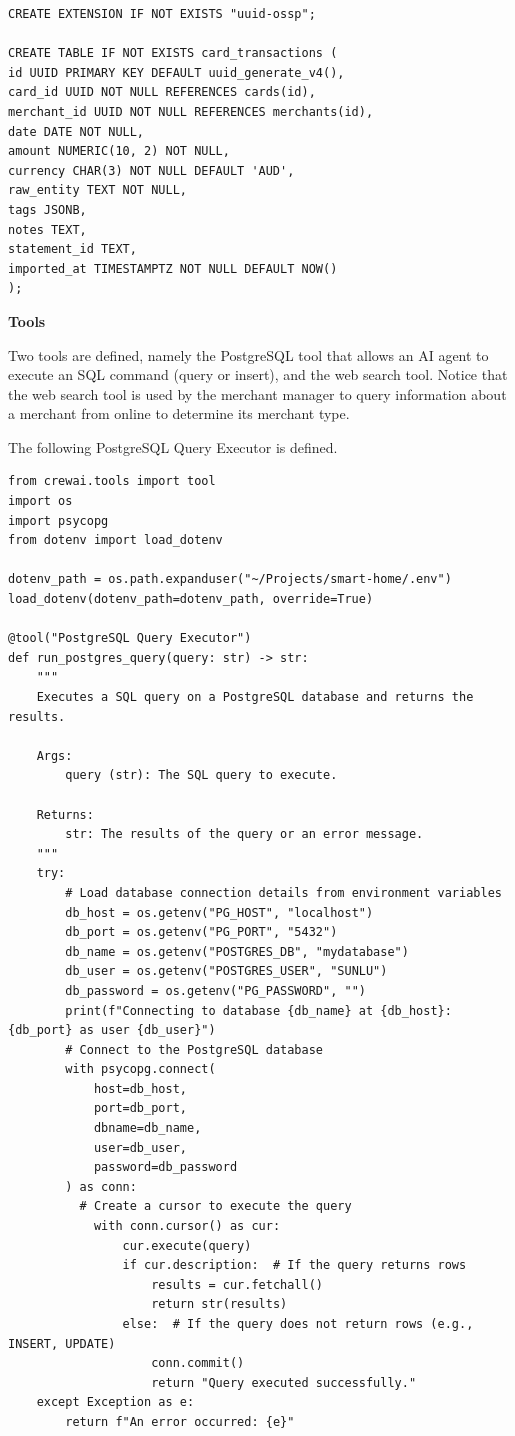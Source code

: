 \begin{lstlisting}
CREATE EXTENSION IF NOT EXISTS "uuid-ossp";

CREATE TABLE IF NOT EXISTS card_transactions (
id UUID PRIMARY KEY DEFAULT uuid_generate_v4(),
card_id UUID NOT NULL REFERENCES cards(id),
merchant_id UUID NOT NULL REFERENCES merchants(id),
date DATE NOT NULL,
amount NUMERIC(10, 2) NOT NULL,
currency CHAR(3) NOT NULL DEFAULT 'AUD',
raw_entity TEXT NOT NULL,
tags JSONB,
notes TEXT,
statement_id TEXT,
imported_at TIMESTAMPTZ NOT NULL DEFAULT NOW()
);
\end{lstlisting}

\vspace{0.1in}
\noindent \textbf{Tools}
\vspace{0.1in}

Two tools are defined, namely the PostgreSQL tool that allows an AI agent to execute an SQL command (query or insert), and the web search tool. Notice that the web search tool is used by the merchant manager to query information about a merchant from online to determine its merchant type.

The following PostgreSQL Query Executor is defined.
\begin{lstlisting}
from crewai.tools import tool
import os
import psycopg
from dotenv import load_dotenv

dotenv_path = os.path.expanduser("~/Projects/smart-home/.env")
load_dotenv(dotenv_path=dotenv_path, override=True)

@tool("PostgreSQL Query Executor")
def run_postgres_query(query: str) -> str:
    """
    Executes a SQL query on a PostgreSQL database and returns the results.

    Args:
        query (str): The SQL query to execute.

    Returns:
        str: The results of the query or an error message.
    """
    try:
        # Load database connection details from environment variables
        db_host = os.getenv("PG_HOST", "localhost")
        db_port = os.getenv("PG_PORT", "5432")
        db_name = os.getenv("POSTGRES_DB", "mydatabase")
        db_user = os.getenv("POSTGRES_USER", "SUNLU")
        db_password = os.getenv("PG_PASSWORD", "")
        print(f"Connecting to database {db_name} at {db_host}:{db_port} as user {db_user}")
        # Connect to the PostgreSQL database
        with psycopg.connect(
            host=db_host,
            port=db_port,
            dbname=db_name,
            user=db_user,
            password=db_password
        ) as conn:
          # Create a cursor to execute the query
            with conn.cursor() as cur:
                cur.execute(query)
                if cur.description:  # If the query returns rows
                    results = cur.fetchall()
                    return str(results)
                else:  # If the query does not return rows (e.g., INSERT, UPDATE)
                    conn.commit()
                    return "Query executed successfully."
    except Exception as e:
        return f"An error occurred: {e}"
\end{lstlisting}

